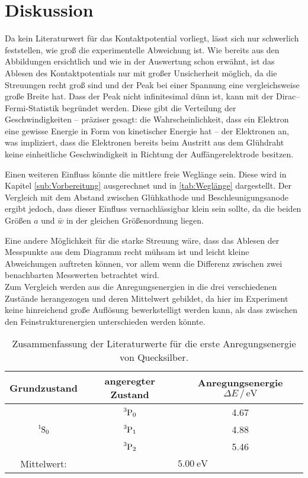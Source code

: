 \section{Diskussion}
\label{sec:Diskussion}

Da kein Literaturwert für das Kontaktpotential vorliegt, lässt sich nur schwerlich feststellen, wie groß die 
experimentelle Abweichung ist. 
Wie bereits aus den Abbildungen ersichtlich und wie in der Auswertung schon erwähnt, ist das Ablesen des Kontaktpotentials 
nur mit großer Unsicherheit möglich, da die Streuungen recht groß sind und der Peak bei einer Spannung eine vergleichsweise 
große Breite hat. 
Dass der Peak nicht infinitesimal dünn ist, kann mit der Dirac--Fermi-Statistik begründet werden. 
Diese gibt die Verteilung der Geschwindigkeiten -- präziser gesagt: die Wahrscheinlichkeit, dass ein Elektron eine gewisse 
Energie in Form von kinetischer Energie hat -- der Elektronen an, was impliziert, dass die Elektronen bereits 
beim Austritt aus dem Glühdraht keine einheitliche Geschwindigkeit in Richtung der Auffängerelektrode besitzen. 

Einen weiteren Einfluss könnte die mittlere freie Weglänge sein. 
Diese wird in Kapitel \ref{sub:Vorbereitung} ausgerechnet und in \ref{tab:Weglänge} dargestellt. 
Der Vergleich mit dem Abstand zwischen Glühkathode und Beschleunigungsanode ergibt jedoch, dass dieser Einfluss vernachlässigbar klein sein sollte, 
da die beiden Größen $a$ und $\bar{w}$ in der gleichen Größenordnung liegen. 

Eine andere Möglichkeit für die starke Streuung wäre, dass das Ablesen der Messpunkte aus dem Diagramm recht mühsam ist 
und leicht kleine Abweichungen auftreten können, vor allem wenn die Differenz zwischen zwei benachbarten Messwerten betrachtet wird. 
\\

Zum Vergleich werden aus \cite{kohlrausch} die Anregungsenergien in die drei verschiedenen Zustände herangezogen 
und deren Mittelwert gebildet, da hier im Experiment keine hinreichend große Auflösung bewerkstelligt werden kann, 
als dass zwischen den Feinstrukturenergien unterschieden werden könnte. 
\begin{table}
    \centering
    \caption{Zusammenfassung der Literaturwerte für die erste Anregungsenergie von Quecksilber\cite[460]{kohlrausch}.}
    \label{tab:Lit}
    \begin{tabular}{c c c}
        \toprule
        Grundzustand & angeregter Zustand & Anregungsenergie $\Delta E\,/\,\si{\electronvolt}$ \\
        \midrule
                    & $\ce{^3P0}$ & 4.67 \\
        $\ce{^1S0}$ & $\ce{^3P1}$ & 4.88 \\
                    & $\ce{^3P2}$ & 5.46 \\
        \midrule
        Mittelwert: & \multicolumn{2}{c}{$\SI{5.00}{\electronvolt}$} \\
        \bottomrule
    \end{tabular}
\end{table}

